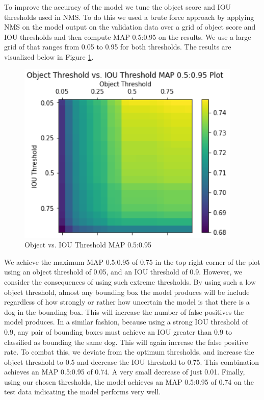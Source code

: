 \documentclass{article}
\begin{document}
To improve the accuracy of the model we tune the object score and IOU thresholds used in NMS.  To do this we used a brute force approach by applying NMS on the model output on the validation data over a grid of object score and IOU thresholds and then compute MAP 0.5:0.95 on the results.  We use a large grid of that ranges from 0.05 to 0.95 for both thresholds.  The results are visualized below in Figure \ref{fig:x object v iou}.  

\begin{figure}[h]
\centering
	\includegraphics[scale=0.7]{final-report-images/map0.5to0.95.png}
\caption{Object vs. IOU Threshold MAP 0.5:0.95}
\label{fig:x object v iou}
\end{figure}

\noindent We achieve the maximum MAP 0.5:0.95 of 0.75 in the top right corner of the plot using an object threshold of 0.05, and an IOU threshold of 0.9.  However, we consider the consequences of using such extreme thresholds.  By using such a low object threshold, almost any bounding box the model produces will be include regardless of how strongly or rather how uncertain the model is that there is a dog in the bounding box.  This will increase the number of false positives the model produces.  In a similar fashion, because using a strong IOU threshold of 0.9, any pair of bounding boxes must achieve an IOU greater than 0.9 to classified as bounding the same dog.  This will again increase the false positive rate.  To combat this, we deviate from the optimum thresholds, and increase the object threshold to 0.5 and decrease the IOU threshold to 0.75.  This combination achieves an MAP 0.5:0.95 of 0.74.  A very small decrease of just 0.01.  Finally, using our chosen thresholds, the model achieves an MAP 0.5:0.95 of 0.74 on the test data indicating the model performs very well.
\end{document}
